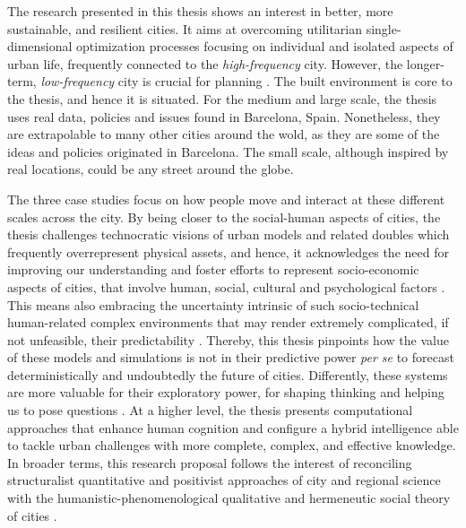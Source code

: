 The research presented in this thesis shows an interest in better, more sustainable, and resilient cities. It aims at overcoming utilitarian single-dimensional optimization processes focusing on individual and isolated aspects of urban life, frequently connected to the \emph{high-frequency} city. However, the longer-term, \emph{low-frequency} city is crucial for planning \citep{Batty2020smartcities}.
The built environment is core to the thesis, and hence it is situated. For the medium and large scale, the thesis uses real data, policies and issues found in Barcelona, Spain. Nonetheless, they are extrapolable to many other cities around the wold, as they are some of the ideas and policies originated in Barcelona. The small scale, although inspired by real locations, could be any street around the globe.

The three case studies focus on how people move and interact at these different scales across the city. By being closer to the social-human aspects of cities, the thesis challenges technocratic visions of urban models and related doubles which frequently overrepresent physical assets, and hence, it acknowledges the need for improving our understanding and foster efforts to represent socio-economic aspects of cities, that involve human, social, cultural and psychological factors \citep{Batty2018}. This means also embracing the uncertainty intrinsic of such socio-technical human-related complex environments \citep{Caldarelli2023} that may render extremely complicated, if not unfeasible, their predictability \citep{Cureton2020}.
Thereby, this thesis pinpoints how the value of these models and simulations is not in their predictive power \emph{per se} to forecast deterministically and undoubtedly the future of cities. Differently, these systems are more valuable for their exploratory power, for shaping thinking and helping us to pose questions \citep{Kac1969}. 
At a higher level, the thesis presents computational approaches that enhance human cognition and configure a hybrid intelligence able to tackle urban challenges with more complete, complex, and effective knowledge.
In broader terms, this research proposal follows the interest of reconciling structuralist quantitative and positivist approaches of city and regional science with the humanistic-phenomenological qualitative and hermeneutic social theory of cities \citep{Port00}.

